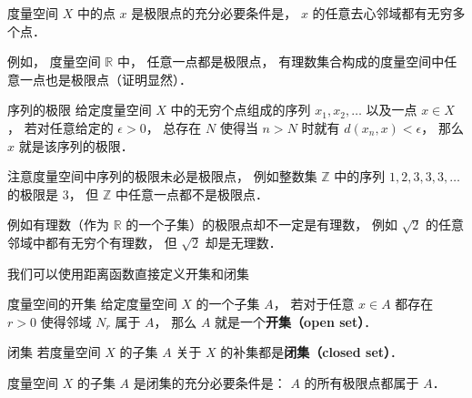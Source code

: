 \begin{corollary}{}
度量空间 $X$ 中的点 $x$ 是极限点的充分必要条件是， $x$ 的任意去心邻域都有无穷多个点．
\end{corollary}

例如， 度量空间 $\mathbb R$ 中， 任意一点都是极限点， 有理数集合构成的度量空间中任意一点也是极限点（证明显然）．

\begin{definition}{序列的极限}
给定度量空间 $X$ 中的无穷个点组成的序列 $x_1, x_2, \dots$ 以及一点 $x \in X$， 若对任意给定的 $\epsilon > 0$， 总存在 $N$ 使得当 $n > N$ 时就有 $d(x_n, x) < \epsilon$， 那么 $x$ 就是该序列的极限．
\end{definition}
注意度量空间中序列的极限未必是极限点， 例如整数集 $\mathbb Z$ 中的序列 $1, 2, 3, 3, 3, \dots$ 的极限是 $3$， 但 $\mathbb Z$ 中任意一点都不是极限点．

例如有理数（作为 $\mathbb R$ 的一个子集）的极限点却不一定是有理数， 例如 $\sqrt{2}$ 的任意邻域中都有无穷个有理数， 但 $\sqrt{2}$ 却是无理数．

我们可以使用距离函数直接定义开集和闭集
\begin{definition}{度量空间的开集}
给定度量空间 $X$ 的一个子集 $A$， 若对于任意 $x \in A$ 都存在 $r > 0$ 使得邻域 $N_r$ 属于 $A$， 那么 $A$ 就是一个\textbf{开集（open set）}．
\end{definition}

\begin{definition}{闭集}
若度量空间 $X$ 的子集 $A$ 关于 $X$ 的补集都是\textbf{闭集（closed set）}．
\end{definition}

\begin{theorem}{}
度量空间 $X$ 的子集 $A$ 是闭集的充分必要条件是： $A$ 的所有极限点都属于 $A$．
\end{theorem}
